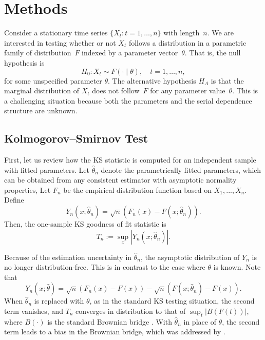 \documentclass[12pt, titlepage, letterpaper]{article}
\begin{document}
\section{Methods}
\label{sec:methods}

Consider a stationary time series $\{X_t: t = 1, \ldots, n\}$ with length~$n$.
We are interested in testing whether or not $X_t$ follows a distribution in a
parametric family of distribution~$F$ indexed by a parameter
vector~$\theta$. That is, the null hypothesis is
\[
  H_0: X_t \sim F(\cdot \mid \theta), \quad t = 1, \ldots, n,
\]
for some unspecified parameter $\theta$.
The alternative hypothesis $H_A$ is that the marginal distribution of $X_t$ does
not follow~$F$ for any parameter value~$\theta$. This is a challenging situation
because both the parameters and the serial dependence structure are unknown.

\subsection{Kolmogorov--Smirnov Test}

First, let us review how the KS statistic is computed for an independent
sample with fitted parameters. Let $\hat\theta_n$ denote the parametrically
fitted parameters, which can be obtained from any consistent estimator with
asymptotic normality properties,  Let $F_n$ be the empirical distribution
function based on $X_1,...,X_n$.
Define 
\begin{equation*}
Y_n(x; \hat\theta_n) = \sqrt{n}(F_n(x) - F(x; \hat\theta_n)).
\end{equation*}
Then, the one-sample KS goodness of fit statistic is 
\begin{equation*}
T_n := \sup_x|Y_n(x; \hat\theta_n)|.
\end{equation*}


Because of the estimation uncertainty in $\hat\theta_n$, the asymptotic
distribution of $Y_n$ is no longer distribution-free. This is in contrast to the
case where $\theta$ is known.  Note that
\begin{equation*}
Y_n(x; \hat\theta) = \sqrt{n}(F_n(x) - F(x)) - 
\sqrt{n}(F(x; \hat\theta_n) - F(x)).
\end{equation*}
When $\hat\theta_n$ is replaced with $\theta$, as in the standard KS testing
situation, the second term vanishes, and $T_n$ converges in distribution to that
of $\sup_t | B(F(t)) |$, where $B(\cdot)$ is the standard Brownian bridge
\citep{kolmogorov1933sulla}. With $\hat\theta_n$ in place of $\theta$, the
second term leads to a bias in the Brownian bridge, which was addressed by
\citet{babu2004goodness}.
\end{document}

